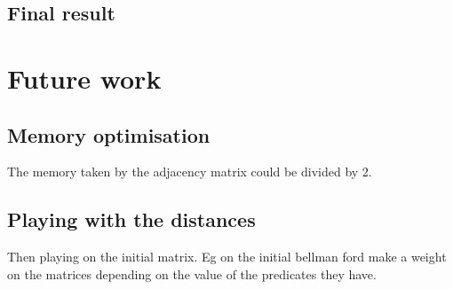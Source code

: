 \documentclass{article}
\begin{document}
\subsection{Final result}



\section{Future work}

\subsection{Memory optimisation}
The memory taken by the adjacency matrix could be divided by 2.


\subsection{Playing with the distances}
Then playing on the initial matrix. Eg on the initial bellman ford make a weight on the matrices depending on the value of the predicates they have. 

\printbibliography[
heading=bibintoc,
title={Bibliography}
]
\end{document}
